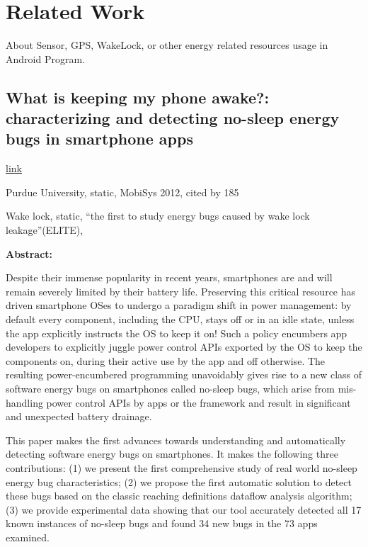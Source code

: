 \section{Related Work}

About Sensor, GPS, WakeLock, or other energy related resources usage in Android
Program.

\subsection{What is keeping my phone awake?: characterizing and detecting no-sleep
  energy bugs in smartphone apps}

\href{http://dl.acm.org/citation.cfm?id=2307661}{link}

Purdue University, static, MobiSys 2012, cited by 185

Wake lock, static, ``the first to study energy bugs caused by wake lock
leakage''(ELITE),



\textbf{Abstract:}

Despite their immense popularity in recent years, smartphones are and will
remain severely limited by their battery life. Preserving this critical resource
has driven smartphone OSes to undergo a paradigm shift in power management: by
default every component, including the CPU, stays off or in an idle state,
unless the app explicitly instructs the OS to keep it on! Such a policy
encumbers app developers to explicitly juggle power control APIs exported by the
OS to keep the components on, during their active use by the app and off
otherwise. The resulting power-encumbered programming unavoidably gives rise to
a new class of software energy bugs on smartphones called no-sleep bugs, which
arise from mis-handling power control APIs by apps or the framework and result
in significant and unexpected battery drainage.

This paper makes the first advances towards understanding and automatically
detecting software energy bugs on smartphones. It makes the following three
contributions: (1) we present the first comprehensive study of real world
no-sleep energy bug characteristics; (2) we propose the first automatic solution
to detect these bugs based on the classic reaching definitions dataflow analysis
algorithm; (3) we provide experimental data showing that our tool accurately
detected all 17 known instances of no-sleep bugs and found 34 new bugs in the 73
apps examined.

